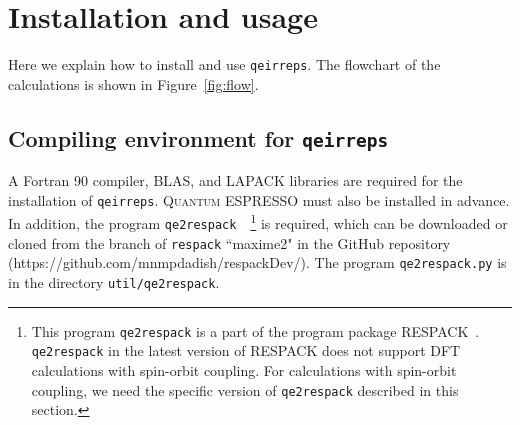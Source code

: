 \documentclass[3p,preprint]{elsarticle}
\newcommand{\akishi}[1]{ { \color{magenta} \footnotesize (\textsf{AM}) \textsf{\textsl{#1}} } }
\newcommand{\delete}[1]{ {\color{red}  \sout{#1}   }}
\begin{document}
\section{Installation and usage}
\label{sec4}
Here we explain how to install and use \texttt{qeirreps}. 
The flowchart of the calculations is shown in Figure~\ref{fig:flow}.

\subsection{Compiling environment for \texttt{qeirreps}}
A Fortran 90 compiler, BLAS, and LAPACK libraries are required for the installation of \texttt{qeirreps}. %
\textsc{Quantum ESPRESSO} must also be installed in advance.
In addition, the program \texttt{qe2respack}~\cite{respack}~\footnote{This program \texttt{qe2respack} is a part of the program package RESPACK~\cite{respack}. 
\texttt{qe2respack} in the latest version of RESPACK does not support DFT calculations with spin-orbit coupling. 
For calculations with spin-orbit coupling, we need the specific version of \texttt{qe2respack} described in this section.} is required, which can be downloaded or cloned from the branch of \texttt{respack} ``maxime2" in the GitHub repository (https://github.com/mnmpdadish/respackDev/). The program \texttt{qe2respack.py} is in the directory \texttt{util/qe2respack}.
\end{document}
